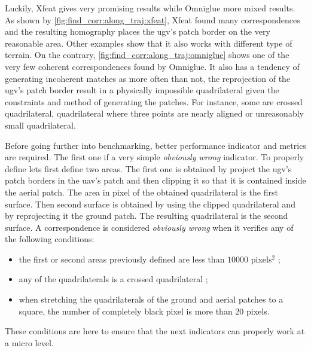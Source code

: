 Luckily, Xfeat gives very promising results while Omniglue more mixed results.
As shown by \cref{fig:find_corr:along_traj:xfeat}, Xfeat found many correspondences and the resulting homography places
the \gls{ugv}'s patch border on the very reasonable area.
Other examples show that it also works with different type of terrain. %
On the contrary, \cref{fig:find_corr:along_traj:omniglue} shows one of the very few coherent correspondences found by Omniglue.
It also has a tendency of generating incoherent matches as more often than not, the reprojection of the \gls{ugv}'s patch
border result in a physically impossible quadrilateral given the constraints and method of generating the patches.
For instance, some are crossed quadrilateral, quadrilateral where three points are nearly aligned or unreasonably small quadrilateral.

Before going further into benchmarking, better performance indicator and metrics are required.
The first one if a very simple \textit{obviously wrong} indicator.
To properly define lets first define two areas.
The first one is obtained by project the \gls{ugv}'s patch borders in the \gls{uav}'s patch and then clipping it so that it
is contained inside the aerial patch.
The area in pixel of the obtained quadrilateral is the first surface.
Then second surface is obtained by using the clipped quadrilateral and by reprojecting it the ground patch.
The resulting quadrilateral is the second surface.
A correspondence is considered \textit{obviously wrong} when it verifies any of the following conditions:
\begin{itemize}
    \item the first or second areas previously defined are less than $10000$ pixels$^2$ ;
    \item any of the quadrilaterals is a crossed quadrilateral ;
    \item when stretching the quadrilaterals of the ground and aerial patches to a square, the number of completely black pixel is more than 20 pixels.
\end{itemize}
These conditions are here to ensure that the next indicators can properly work at a micro level.

